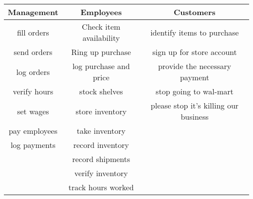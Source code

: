 \documentclass{letter}
\begin{document}
\begin{enumerate}
		\begin{tabular}{c | c | c}
		Management & Employees & Customers \\ \hline
		fill orders & Check item availability & identify items to purchase\\
		send orders & Ring up purchase & sign up for store account\\
		log orders & log purchase and price & provide the necessary payment\\
		verify hours & stock shelves & stop going to wal-mart\\
		set wages & store inventory & please stop it's killing our business\\
		pay employees & take inventory &\\
		log payments & record inventory &\\
		 & record shipments &\\
		 & verify inventory &\\
		 & track hours worked &
		\end{tabular}
\end{enumerate}
\end{document}
